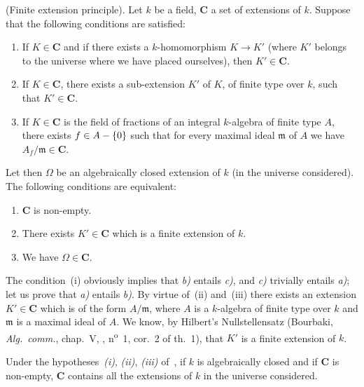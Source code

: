 \begin{proposition}[9.1.1]
\label{IV.9.1.1}
\textnormal{(Finite extension principle).}
Let $k$ be a field, $\boldsymbol{C}$ a set of extensions of $k$.
Suppose that the following conditions are satisfied:
\begin{enumerate}[label=\textup{(\roman*)}]
  \item If $K\in\boldsymbol{C}$ and if there exists a $k$-homomorphism $K\to K'$ (where $K'$ belongs to the universe where we have placed ourselves), then $K'\in\boldsymbol{C}$.
  \item If $K\in\boldsymbol{C}$, there exists a sub-extension $K'$ of $K$, of finite type over $k$, such that $K'\in\boldsymbol{C}$.
  \item If $K\in\boldsymbol{C}$ is the field of fractions of an integral $k$-algebra of finite type $A$, there exists $f\in A-\{0\}$ such that for every maximal ideal $\mathfrak{m}$ of $A$ we have $A_f/\mathfrak{m}\in\boldsymbol{C}$.
\end{enumerate}


Let then $\Omega$ be an algebraically closed extension of $k$ (in the universe considered).
The following conditions are equivalent:
\begin{enumerate}[label=\emph{\alph*)}]
  \item $\boldsymbol{C}$ is non-empty.
  \item There exists $K'\in\boldsymbol{C}$ which is a \textup{finite} extension of $k$.
  \item We have $\Omega\in\boldsymbol{C}$.
\end{enumerate}
\end{proposition}

The condition~(i) obviously implies that \emph{b)} entails \emph{c)}, and \emph{c)} trivially entails \emph{a)};
let us prove that \emph{a)} entails \emph{b)}.
By virtue of~(ii) and~(iii) there exists an extension $K'\in\boldsymbol{C}$ which is of the form $A/\mathfrak{m}$, where $A$ is a $k$-algebra of finite type over $k$ and $\mathfrak{m}$ is a maximal ideal of $A$.
We know, by Hilbert's Nullstellensatz (Bourbaki, \emph{Alg.\ comm.}, chap.~V, , n\textsuperscript{o}~1, cor.~2 of th.~1), that $K'$ is a finite extension of $k$.

\begin{corollary}[9.1.2]
\label{IV.9.1.2}
Under the hypotheses~\emph{(i)}, \emph{(ii)}, \emph{(iii)} of~, if $k$ is algebraically closed and if $\boldsymbol{C}$ is non-empty, $\boldsymbol{C}$ contains all the extensions of $k$ in the universe considered.
\end{corollary}

